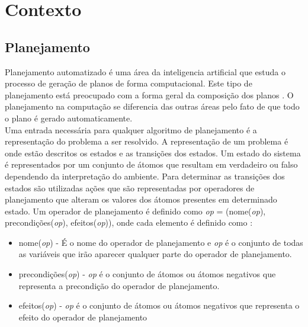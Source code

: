 \chapter{\label{chap:conte}Contexto}


\section{Planejamento} 

Planejamento automatizado é uma área da inteligencia artificial que estuda o processo de geração de planos de forma computacional. Este tipo de planejamento está preocupado com a forma geral da composição dos planos \cite{ghallab2004automated}. O planejamento na computação se diferencia das outras áreas pelo fato de que todo o plano é gerado automaticamente. \\


Uma entrada necessária para qualquer algoritmo de planejamento é a representação do problema a ser resolvido. A representação de um problema é onde estão descritos os estados e as transições dos estados. Um estado do sistema é representados por um conjunto de átomos que resultam em verdadeiro ou falso dependendo da interpretação do ambiente. Para determinar as transições dos estados são utilizadas ações que são  representadas por operadores de planejamento que alteram os valores dos átomos presentes em determinado estado. Um operador de planejamento é definido como \textit{op} = (nome(\textit{op}), precondições(\textit{op}), efeitos(\textit{op})), onde cada elemento é definido como \cite{ghallab2004automated}: 

\begin{itemize}
	\item nome(\textit{op}) - É o nome do operador de planejamento e \textit{op} é o conjunto de todas as variáveis que irão aparecer qualquer parte do operador de planejamento.  
	\item precondições(\textit{op}) - \textit{op} é o conjunto de átomos ou átomos negativos que representa a precondição do operador de planejamento. 
	\item efeitos(\textit{op}) - \textit{op} é o conjunto de átomos ou átomos negativos que representa o efeito do operador de planejamento
\end{itemize}

